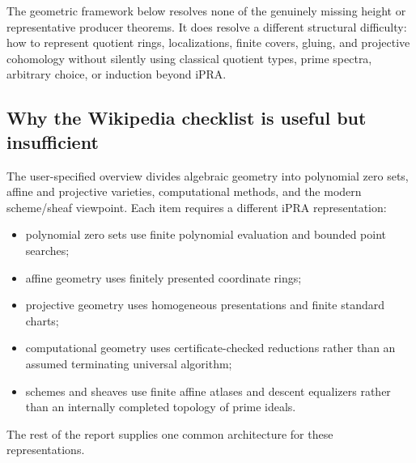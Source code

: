 The geometric framework below resolves none of the genuinely missing height or representative
producer theorems.  It does resolve a different structural difficulty: how to represent quotient
rings, localizations, finite covers, gluing, and projective cohomology without silently using
classical quotient types, prime spectra, arbitrary choice, or induction beyond iPRA.

\subsection{Why the Wikipedia checklist is useful but insufficient}

The user-specified overview divides algebraic geometry into polynomial zero sets, affine and
projective varieties, computational methods, and the modern scheme/sheaf viewpoint.  Each item
requires a different iPRA representation:

\begin{itemize}
\item polynomial zero sets use finite polynomial evaluation and bounded point searches;
\item affine geometry uses finitely presented coordinate rings;
\item projective geometry uses homogeneous presentations and finite standard charts;
\item computational geometry uses certificate-checked reductions rather than an assumed terminating
      universal algorithm;
\item schemes and sheaves use finite affine atlases and descent equalizers rather than an internally
      completed topology of prime ideals.
\end{itemize}

The rest of the report supplies one common architecture for these representations.
